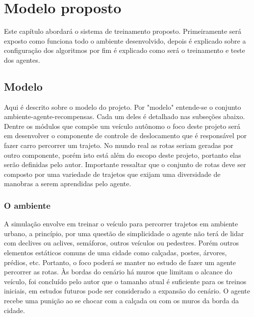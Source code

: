 \chapter{Modelo proposto}\label{cap:proposta}
Este capítulo abordará o sistema de treinamento proposto. Primeiramente será exposto como funciona todo o ambiente desenvolvido, depois é explicado sobre a configuração dos algoritmos por fim é explicado como será o treinamento e teste dos agentes. 

\section{Modelo}\label{modelo}
Aqui é descrito sobre o modelo do projeto. Por "modelo" entende-se o conjunto ambiente-agente-recompensas. Cada um deles é detalhado nas subseções abaixo. Dentre os módulos que compõe um veículo autônomo o foco deste projeto será em desenvolver o componente de controle de deslocamento que é responsável por fazer carro percorrer um trajeto. No mundo real as rotas seriam geradas por outro componente, porém isto está além do escopo deste projeto, portanto elas serão definidas pelo autor. Importante ressaltar que o conjunto de rotas deve ser composto por uma variedade de trajetos que exijam uma diversidade de manobras a serem aprendidas pelo agente.

\subsection{O ambiente}
A simulação envolve em treinar o veículo para percorrer trajetos em ambiente urbano, a princípio, por uma questão de simplicidade o agente não terá de lidar com declives ou aclives, semáforos, outros veículos ou pedestres. Porém outros elementos estáticos comuns de uma cidade como calçadas, postes, árvores, prédios, etc. Portanto, o foco poderá se manter no estudo de fazer um agente percorrer as rotas. Às bordas do cenário há muros que limitam o alcance do veículo, foi concluído pelo autor que o tamanho atual é suficiente para os treinos iniciais, em estudos futuros pode ser considerado a expansão do cenário. O agente recebe uma punição ao se chocar com a calçada ou com os muros da borda da cidade.

